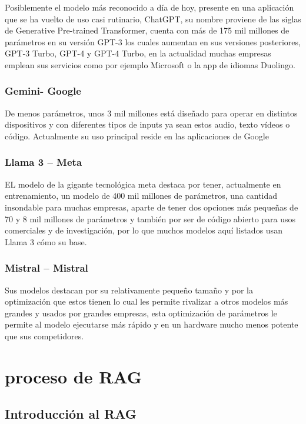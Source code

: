 Posiblemente el modelo más reconocido a día de hoy, presente en una aplicación que se ha vuelto de uso casi rutinario, ChatGPT, su nombre proviene de las siglas de Generative Pre-trained Transformer, cuenta con más de 175 mil millones de parámetros en su versión GPT-3 los cuales aumentan en sus versiones posteriores, GPT-3 Turbo, GPT-4 y GPT-4 Turbo, en la actualidad muchas empresas emplean sus servicios como por ejemplo Microsoft o la app de idiomas Duolingo.

\subsubsection{Gemini- Google}

 De menos parámetros, unos 3 mil millones está diseñado para operar en distintos dispositivos y con diferentes tipos de inputs ya sean estos audio, texto vídeos o código. Actualmente su uso principal reside en las aplicaciones de Google
 
\subsubsection{Llama 3 – Meta}

EL modelo de la gigante tecnológica meta destaca por tener, actualmente en entrenamiento, un modelo de 400 mil millones de parámetros, una cantidad insondable para muchas empresas, aparte de tener dos opciones más pequeñas de 70 y 8 mil millones de parámetros y también por ser de código abierto para usos comerciales y de investigación, por lo que muchos modelos aquí listados usan Llama 3 cómo su base.

\subsubsection{Mistral – Mistral}

Sus modelos destacan por su relativamente pequeño tamaño y por la optimización que estos tienen lo cual les permite rivalizar a otros modelos más grandes y usados por grandes empresas, esta optimización de parámetros le permite al modelo ejecutarse más rápido y en un hardware mucho menos potente que sus competidores.


\section{proceso de RAG}
\subsection{Introducción al RAG}

